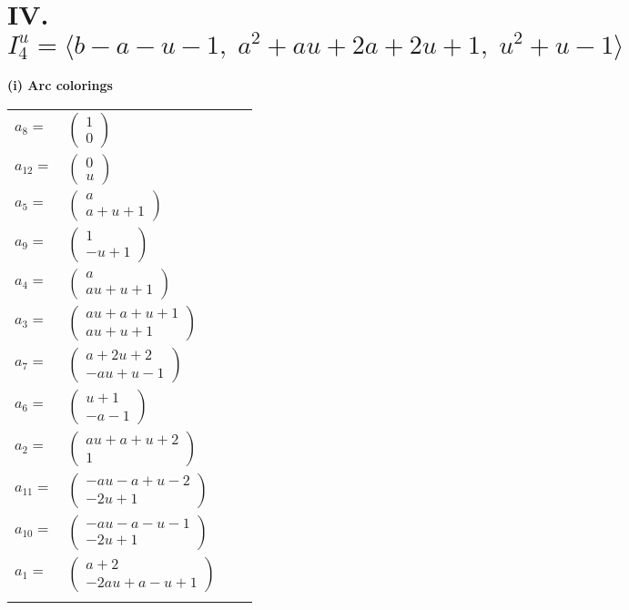 \documentclass[1p]{elsarticle_modified}
\theoremstyle{definition}
\begin{document}
\centering \section*{IV. $I^u_{4}= \langle b- a- u-1,\;a^2+a u+2 a+2 u+1,\;u^2+u-1 \rangle$}
\flushleft \textbf{(i) Arc colorings}\\
\begin{tabular}{m{7pt} m{180pt} m{7pt} m{180pt} }
\flushright $a_{8}=$&$\begin{pmatrix}1\\0\end{pmatrix}$ \\
\flushright $a_{12}=$&$\begin{pmatrix}0\\u\end{pmatrix}$ \\
\flushright $a_{5}=$&$\begin{pmatrix}a\\a+u+1\end{pmatrix}$ \\
\flushright $a_{9}=$&$\begin{pmatrix}1\\- u+1\end{pmatrix}$ \\
\flushright $a_{4}=$&$\begin{pmatrix}a\\a u+u+1\end{pmatrix}$ \\
\flushright $a_{3}=$&$\begin{pmatrix}a u+a+u+1\\a u+u+1\end{pmatrix}$ \\
\flushright $a_{7}=$&$\begin{pmatrix}a+2 u+2\\- a u+u-1\end{pmatrix}$ \\
\flushright $a_{6}=$&$\begin{pmatrix}u+1\\- a-1\end{pmatrix}$ \\
\flushright $a_{2}=$&$\begin{pmatrix}a u+a+u+2\\1\end{pmatrix}$ \\
\flushright $a_{11}=$&$\begin{pmatrix}- a u- a+u-2\\-2 u+1\end{pmatrix}$ \\
\flushright $a_{10}=$&$\begin{pmatrix}- a u- a- u-1\\-2 u+1\end{pmatrix}$ \\
\flushright $a_{1}=$&$\begin{pmatrix}a+2\\-2 a u+a- u+1\end{pmatrix}$\\&\end{tabular}
\end{document}
